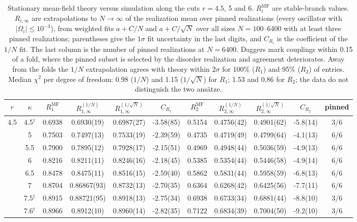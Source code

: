 \begin{table}
\caption{Stationary mean-field theory versus simulation along the cuts $r=4.5$, 5 and 6. $R_i^{\mathrm{MF}}$ are stable-branch values. $R_{i,\infty}$ are extrapolations to $N\to\infty$ of the realization mean over pinned realizations (every oscillator with $|\Omega_i|\le10^{-3}$), from weighted fits $a+C/N$ and $a+C/\sqrt{N}$ over all sizes $N=100$--6400 with at least three pinned realizations; parentheses give the $1\sigma$ fit uncertainty in the last digits, and $C_{R_i}$ is the coefficient of the $1/N$ fit. The last column is the number of pinned realizations at $N=6400$. Daggers mark couplings within 0.15 of a fold, where the pinned subset is selected by the disorder realization and agreement deteriorates. Away from the folds the $1/N$ extrapolation agrees with theory within $2\sigma$ for 100\% ($R_1$) and 95\% ($R_2$) of entries. Median $\chi^2$ per degree of freedom: 0.98 ($1/N$) and 1.15 ($1/\sqrt{N}$) for $R_1$; 1.53 and 0.86 for $R_2$; the data do not distinguish the two ans\"atze.}
\label{tab:mf-comparison}
\centering
\scriptsize
\setlength{\tabcolsep}{2.5pt}
\begin{tabular}{cc|cccc|cccc|c}
\hline\hline
$r$ & $\kappa$ & $R_1^{\mathrm{MF}}$ & $R_{1,\infty}^{(1/N)}$ & $R_{1,\infty}^{(1/\sqrt{N})}$ & $C_{R_1}$ & $R_2^{\mathrm{MF}}$ & $R_{2,\infty}^{(1/N)}$ & $R_{2,\infty}^{(1/\sqrt{N})}$ & $C_{R_2}$ & pinned \\
\hline
4.5 & 4.5$^\dagger$ & 0.6938 & 0.6930(19) & 0.6987(27) & -3.58(85) & 0.5154 & 0.4756(42) & 0.4901(62) & -5.8(14) & 3/6 \\
 & 5 & 0.7503 & 0.7497(13) & 0.7533(19) & -2.39(59) & 0.4735 & 0.4719(49) & 0.4799(64) & -4.1(13) & 6/6 \\
 & 5.5 & 0.7900 & 0.7895(12) & 0.7928(17) & -2.15(51) & 0.4969 & 0.4948(44) & 0.5036(59) & -4.9(13) & 6/6 \\
 & 6 & 0.8216 & 0.8211(11) & 0.8246(16) & -2.18(45) & 0.5385 & 0.5354(44) & 0.5446(58) & -4.9(14) & 6/6 \\
 & 6.5 & 0.8478 & 0.8475(11) & 0.8516(15) & -2.59(40) & 0.5862 & 0.5831(44) & 0.5958(59) & -6.8(13) & 6/6 \\
 & 7 & 0.8704 & 0.86867(93) & 0.8732(13) & -2.70(35) & 0.6364 & 0.6268(42) & 0.6425(56) & -7.7(11) & 6/6 \\
 & 7.5$^\dagger$ & 0.8915 & 0.88721(95) & 0.8918(13) & -2.75(34) & 0.6938 & 0.6733(34) & 0.6881(44) & -8.8(10) & 3/6 \\
 & 7.6$^\dagger$ & 0.8966 & 0.8912(10) & 0.8960(14) & -2.82(35) & 0.7122 & 0.6834(39) & 0.7004(50) & -9.2(10) & 3/6 \\

\end{tabular}
\end{table}
